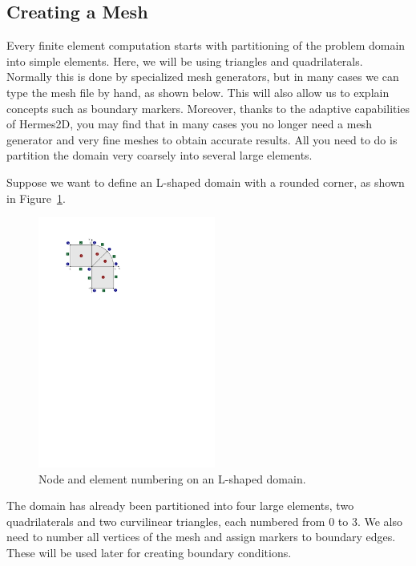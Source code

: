 \documentclass[11pt]{article}
\begin{document}

\subsection{Creating a Mesh}

Every finite element computation starts with partitioning of the problem domain
into simple elements. Here, we will be using triangles and quadrilaterals.
Normally this is done by specialized mesh generators, but in many cases we
can type the mesh file by hand, as shown below. This will also allow us to explain
concepts such as boundary markers. Moreover, thanks to the adaptive capabilities
of Hermes2D, you may find that in many cases you no longer need a mesh generator
and very fine meshes to obtain accurate results. All you need to do is partition
the domain very coarsely into several large elements.

Suppose we want to define an L-shaped domain with a rounded corner, as shown in
Figure~\ref{fig:simplemesh}.

\begin{figure}[ht]
  \smallskip\centering
  \includegraphics[width=0.52\textwidth]{img/simplemesh}
  \caption{Node and element numbering on an L-shaped domain.}
  \label{fig:simplemesh}
\end{figure}
The domain has already been partitioned into four large
elements, two quadrilaterals and two curvilinear triangles, each numbered from 0 to 3.
We also need to number all vertices of the mesh and assign markers to boundary edges.
These will be used later for creating boundary conditions.
\end{document}
